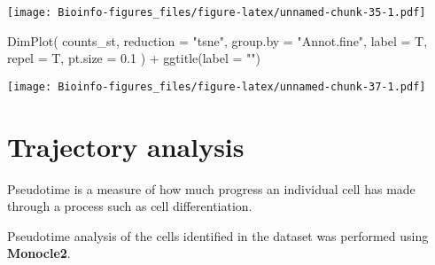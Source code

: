 \documentclass[
  openany]{book}
\newenvironment{Shaded}{\begin{snugshade}}{\end{snugshade}}
\newcommand{\AttributeTok}[1]{\textcolor[rgb]{0.77,0.63,0.00}{#1}}
\newcommand{\FloatTok}[1]{\textcolor[rgb]{0.00,0.00,0.81}{#1}}
\newcommand{\FunctionTok}[1]{\textcolor[rgb]{0.00,0.00,0.00}{#1}}
\newcommand{\NormalTok}[1]{#1}
\newcommand{\OtherTok}[1]{\textcolor[rgb]{0.56,0.35,0.01}{#1}}
\newcommand{\SpecialCharTok}[1]{\textcolor[rgb]{0.00,0.00,0.00}{#1}}
\newcommand{\StringTok}[1]{\textcolor[rgb]{0.31,0.60,0.02}{#1}}
\begin{document}
\texttt{[image: Bioinfo-figures\_files/figure-latex/unnamed-chunk-35-1.pdf]}

\begin{Shaded}
\end{Shaded}

\begin{Shaded}
\begin{Highlighting}[]
\FunctionTok{DimPlot}\NormalTok{(}
\NormalTok{  counts\_st,}
  \AttributeTok{reduction =} \StringTok{"tsne"}\NormalTok{,}
  \AttributeTok{group.by =} \StringTok{"Annot.fine"}\NormalTok{,}
  \AttributeTok{label =}\NormalTok{ T,}
  \AttributeTok{repel =}\NormalTok{ T,}
  \AttributeTok{pt.size =} \FloatTok{0.1}
\NormalTok{) }\SpecialCharTok{+} \FunctionTok{ggtitle}\NormalTok{(}\AttributeTok{label =} \StringTok{""}\NormalTok{)}
\end{Highlighting}
\end{Shaded}

\texttt{[image: Bioinfo-figures\_files/figure-latex/unnamed-chunk-37-1.pdf]}

\clearpage

\hypertarget{trajectory-analysis}{%
\section{Trajectory analysis}\label{trajectory-analysis}}

Pseudotime is a measure of how much progress an individual cell has made through a process such as cell differentiation.

Pseudotime analysis of the cells identified in the dataset was performed using \textbf{Monocle2}.
\end{document}
